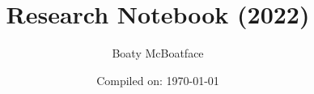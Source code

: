 \documentclass[openany,onecolumn,oneside]{memoir}
\begin{document}

\title{Research Notebook (2022)}
\author{Boaty McBoatface}
\date{Compiled on: \today }
\maketitle
\clearpage



\begin{KeepFromToc}
    \tableofcontents
\end{KeepFromToc}

\newpage
\newpage
{}








% 
%



{}





\renewcommand*{\bibfont}{\footnotesize}

%
%

\printbibliography{}
\end{document}
